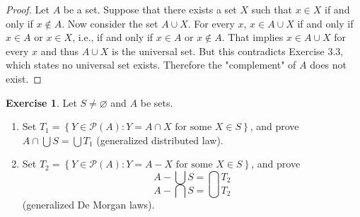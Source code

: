 \documentclass[a4paper,11pt]{article}
\theoremstyle{definition}
\newtheorem{exercise}{Exercise}[subsection]
\begin{document}
\begin{proof}
  Let \(A\) be a set. Suppose that there exists a set \(X\) such that
  \(x \in X\) if and only if \(x \notin A\). Now consider the set \(A \cup X\). For every
  \(x\), \(x \in A \cup X\) if and only if \(x \in A\) or \(x \in X\), i.e., if and only
  if \(x \in A\) or \(x \notin A\). That implies \(x \in A \cup X\) for every
  \(x\) and thus \(A \cup X\) is the universal set. But this contradicts Exercise
  3.3, which states no universal set exists. Therefore the "complement" of \(A\)
  does not exist.
\end{proof}

\begin{exercise}
  Let \(S \ne \varnothing\) and \(A\) be sets.

  \begin{enumerate}
  \item Set
    \(T_1 = \left\{ Y \in \mathcal{P}(A) : Y = A \cap X \text{ for some } X \in S \right\}\), and
    prove \(A \cap \bigcup S = \bigcup T_1\) (generalized distributed law).
  \item Set \(T_2 = \left\{ Y \in \mathcal{P}(A) : Y = A - X \text{ for some } X \in S \right\}\), and prove
    \[A - \bigcup S = \bigcap T_2\]
    \[A - \bigcap S = \bigcup T_2\]
    (generalized De Morgan laws).
  \end{enumerate}
\end{exercise}
\end{document}
